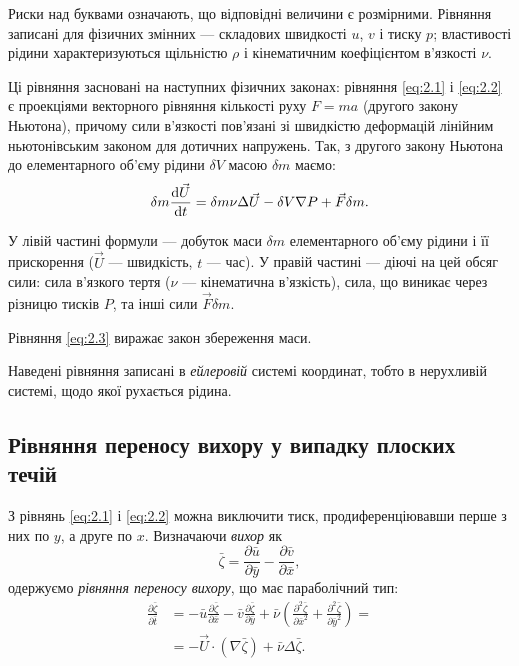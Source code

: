 \begin{remark}
    Риски над буквами означають, що відповідні величини є розмірними. Рівняння записані для фізичних змінних --- складових швидкості $u$, $v$ і тиску $p$; властивості рідини характеризуються щільністю $\rho$ і кінематичним коефіцієнтом в'язкості $\nu$.
\end{remark}
 
Ці рівняння засновані на наступних фізичних законах: рівняння \eqref{eq:2.1} і \eqref{eq:2.2} є проекціями векторного рівняння кількості руху $F = m a$ (другого закону Ньютона), причому сили в'язкості пов'язані зі швидкістю деформацій лінійним ньютонівським законом для дотичних напружень. Так, з другого закону Ньютона до елементарного об'єму рідини $\delta V$ масою $\delta m$ маємо:
\begin{equation}
    \delta m \frac{\diff \vec U}{\diff t} = \delta m \nu \Delta \vec U - \delta V \nabla P + \vec F \delta m.
\end{equation}
	 
У лівій частині формули --- добуток маси $\delta m$ елементарного об'єму рідини і її прискорення ($\vec U$ --- швидкість, $t$ --- час). У правій частині --- діючі на цей обсяг сили: сила в'язкого тертя ($\nu$ --- кінематична в'язкість), сила, що виникає через різницю тисків $P$, та інші сили $\vec F \delta m$.

\begin{remark}
    Рівняння \eqref{eq:2.3} виражає закон збереження маси.
\end{remark}

\begin{definition}
    Наведені рівняння записані в \textit{ейлеровій} системі координат, тобто в нерухливій системі, щодо якої рухається рідина. 
\end{definition}

\subsection{Рівняння переносу вихору %
у випадку плоских течій}

З рівнянь \eqref{eq:2.1} і \eqref{eq:2.2} можна виключити тиск, продиференціювавши перше з них по $y$, а друге по $x$. Визначаючи \textit{вихор} як
\begin{equation}
    \label{eq:2.4}
    \bar \zeta = \frac{\partial \bar u}{\partial \bar y} - \frac{\partial \bar v}{\partial \bar x},
\end{equation}
одержуємо \textit{рівняння переносу вихору}, що має параболічний тип:
\begin{equation}
    \label{eq:2.5}
    \begin{aligned}
        \frac{\partial \bar \zeta}{\partial \bar t} &= -\bar u \frac{\partial \bar \zeta}{\partial \bar x} - \bar v \frac{\partial \bar \zeta}{\partial \bar y} + \bar \nu \left( \frac{\partial^2 \bar \zeta}{\partial \bar x^2} + \frac{\partial^2 \bar \zeta}{\partial \bar y^2} \right) = \\
        &= - \vec U \cdot (\nabla \bar \zeta) + \bar \nu \Delta \bar \zeta.
    \end{aligned}
\end{equation}

